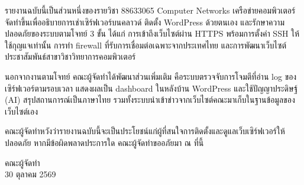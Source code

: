 
รายงานฉบับนี้เป็นส่วนหนึ่งของรายวิชา 88633065 Computer Networks เครือข่ายคอมพิวเตอร์ จัดทำขึ้นเพื่ออธิบายการเช่าเซิร์ฟเวอร์บนคลาวด์ ติดตั้ง WordPress ด้วยตนเอง และรักษาความปลอดภัยของระบบตามโจทย์ 3 ขั้น ได้แก่ การเข้าถึงเว็บไซต์ผ่าน HTTPS พร้อมการตั้งค่า SSH ให้ใช้กุญแจเท่านั้น การทำ firewall ที่รับการเชื่อมต่อเฉพาะจากประเทศไทย และการพัฒนาเว็บไซต์ประชาสัมพันธ์สาขาวิชาวิทยาการคอมพิวเตอร์

นอกจากงานตามโจทย์ คณะผู้จัดทำได้พัฒนาส่วนเพิ่มเติม คือระบบตรวจจับการโจมตีที่อ่าน log ของเซิร์ฟเวอร์ตามรอบเวลา แสดงผลเป็น dashboard ในหลังบ้าน WordPress และใช้ปัญญาประดิษฐ์ (AI) สรุปสถานการณ์เป็นภาษาไทย รวมทั้งระบบนำเข้าข่าวจากเว็บไซต์คณะมาเก็บในฐานข้อมูลของเว็บไซต์เอง

คณะผู้จัดทำหวังว่ารายงานฉบับนี้จะเป็นประโยชน์แก่ผู้ที่สนใจการติดตั้งและดูแลเว็บเซิร์ฟเวอร์ให้ปลอดภัย หากมีข้อผิดพลาดประการใด คณะผู้จัดทำขออภัยมา ณ ที่นี้

\begin{flushright}คณะผู้จัดทำ\\[4pt]30 ตุลาคม 2569\end{flushright}
